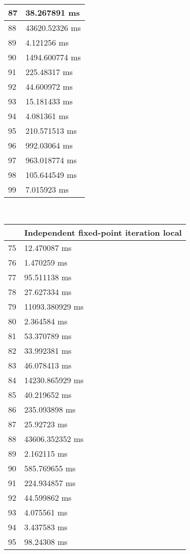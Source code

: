 \begin{multicols}{2}
\begin{tabular}{|l|l|}
		87 & 38.267891 ms \\ \hline
		88 & 43620.52326 ms \\ \hline
		89 & 4.121256 ms \\ \hline
		90 & 1494.600774 ms \\ \hline
		91 & 225.48317 ms \\ \hline
		92 & 44.600972 ms \\ \hline
		93 & 15.181433 ms \\ \hline
		94 & 4.081361 ms \\ \hline
		95 & 210.571513 ms \\ \hline
		96 & 992.03064 ms \\ \hline
		97 & 963.018774 ms \\ \hline
		98 & 105.644549 ms \\ \hline
		99 & 7.015923 ms \\ \hline
	\end{tabular}\\
	\begin{tabular}{|l|l|}
		\hline
		& Independent fixed-point iteration local \\ \hline
		75 & 12.470087 ms \\ \hline
		76 & 1.470259 ms \\ \hline
		77 & 95.511138 ms \\ \hline
		78 & 27.627334 ms \\ \hline
		79 & 11093.380929 ms \\ \hline
		80 & 2.364584 ms \\ \hline
		81 & 53.370789 ms \\ \hline
		82 & 33.992381 ms \\ \hline
		83 & 46.078413 ms \\ \hline
		84 & 14230.865929 ms \\ \hline
		85 & 40.219652 ms \\ \hline
		86 & 235.093898 ms \\ \hline
		87 & 25.92723 ms \\ \hline
		88 & 43606.352352 ms \\ \hline
		89 & 2.162115 ms \\ \hline
		90 & 585.769655 ms \\ \hline
		91 & 224.934857 ms \\ \hline
		92 & 44.599862 ms \\ \hline
		93 & 4.075561 ms \\ \hline
		94 & 3.437583 ms \\ \hline
		95 & 98.24308 ms \\ \hline

\end{tabular}
\end{multicols}
